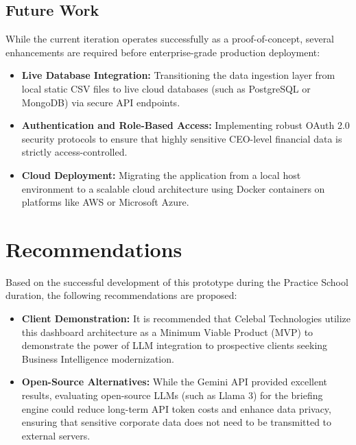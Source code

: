 \documentclass{book}
\begin{document}
\section{Future Work}
While the current iteration operates successfully as a proof-of-concept, several enhancements are required before enterprise-grade production deployment:
\begin{itemize}
    \item \textbf{Live Database Integration:} Transitioning the data ingestion layer from local static CSV files to live cloud databases (such as PostgreSQL or MongoDB) via secure API endpoints.
    \item \textbf{Authentication and Role-Based Access:} Implementing robust OAuth 2.0 security protocols to ensure that highly sensitive CEO-level financial data is strictly access-controlled.
    \item \textbf{Cloud Deployment:} Migrating the application from a local host environment to a scalable cloud architecture using Docker containers on platforms like AWS or Microsoft Azure.
\end{itemize}


\chapter{Recommendations}
Based on the successful development of this prototype during the Practice School duration, the following recommendations are proposed:
\begin{itemize}
    \item \textbf{Client Demonstration:} It is recommended that Celebal Technologies utilize this dashboard architecture as a Minimum Viable Product (MVP) to demonstrate the power of LLM integration to prospective clients seeking Business Intelligence modernization.
    \item \textbf{Open-Source Alternatives:} While the Gemini API provided excellent results, evaluating open-source LLMs (such as Llama 3) for the briefing engine could reduce long-term API token costs and enhance data privacy, ensuring that sensitive corporate data does not need to be transmitted to external servers.
\end{itemize}




% 


\end{document}
